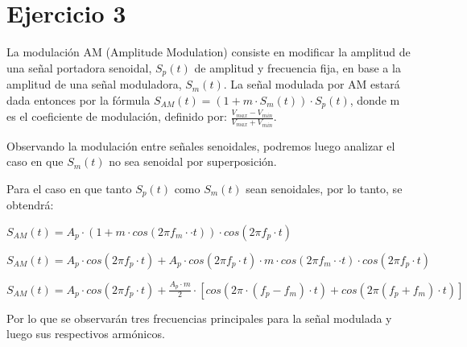 \documentclass[../../labo_tp5_main.tex]{subfiles}
\begin{document}
\section{Ejercicio 3}

La modulación AM (Amplitude Modulation) consiste en modificar la amplitud de una señal portadora senoidal, $S_p(t)$ de amplitud y frecuencia fija, en base a la amplitud de una señal moduladora, $S_m(t)$. 
La señal modulada por AM estará dada entonces por la fórmula $S_{AM}(t) = (1 + m\cdot S_m(t))\cdot S_p(t)$, donde m es el coeficiente de modulación, definido por: $\frac{V_{max} - V_{min}}{V_{max} + V_{min}}$.\par
Observando la modulación entre señales senoidales, podremos luego analizar el caso en que $S_m(t)$ no sea senoidal por superposición. \par

Para el caso en que tanto $S_p(t)$ como $S_m(t)$ sean senoidales, por lo tanto, se obtendrá:\par
\begin{center}
$S_{AM}(t) = A_p\cdot (1 + m\cdot cos(2\pi f_m\cdot\cdot t))\cdot cos(2\pi f_p\cdot t)$\par
$S_{AM}(t) = A_p\cdot cos(2\pi f_p\cdot t) + A_p\cdot cos(2\pi f_p\cdot t)\cdot m\cdot cos(2\pi f_m\cdot\cdot t)\cdot cos(2\pi f_p\cdot t)$\par
$S_{AM}(t) = A_p\cdot cos(2\pi f_p\cdot t) + \frac{A_p\cdot m}{2}\cdot [cos(2\pi \cdot (f_p-f_m)\cdot t) + cos(2\pi (f_p+f_m)\cdot t)]$\par
\end{center}

Por lo que se observarán tres frecuencias principales para la señal modulada y luego sus respectivos armónicos.\par
\end{document}
